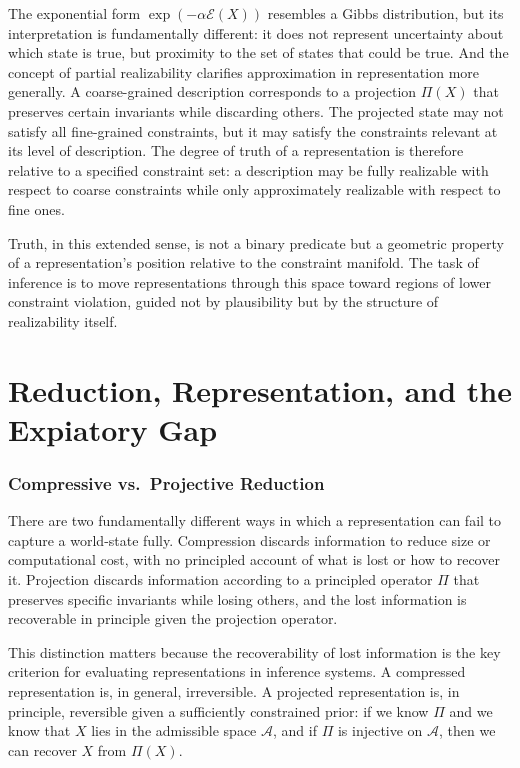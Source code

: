 \documentclass[11pt, oneside]{article}
\begin{document}
The exponential form $\exp(-\alpha \mathcal{E}(X))$ resembles a Gibbs distribution, but its interpretation is fundamentally different: it does not represent uncertainty about which state is true, but proximity to the set of states that could be true. And the concept of partial realizability clarifies approximation in representation more generally. A coarse-grained description corresponds to a projection $\Pi(X)$ that preserves certain invariants while discarding others. The projected state may not satisfy all fine-grained constraints, but it may satisfy the constraints relevant at its level of description. The degree of truth of a representation is therefore relative to a specified constraint set: a description may be fully realizable with respect to coarse constraints while only approximately realizable with respect to fine ones.

Truth, in this extended sense, is not a binary predicate but a geometric property of a representation's position relative to the constraint manifold. The task of inference is to move representations through this space toward regions of lower constraint violation, guided not by plausibility but by the structure of realizability itself.

\part{Reduction, Representation, and the Expiatory Gap}

\section{Compressive vs.\ Projective Reduction}

There are two fundamentally different ways in which a representation can fail to capture a world-state fully. Compression discards information to reduce size or computational cost, with no principled account of what is lost or how to recover it. Projection discards information according to a principled operator $\Pi$ that preserves specific invariants while losing others, and the lost information is recoverable in principle given the projection operator.

This distinction matters because the recoverability of lost information is the key criterion for evaluating representations in inference systems. A compressed representation is, in general, irreversible. A projected representation is, in principle, reversible given a sufficiently constrained prior: if we know $\Pi$ and we know that $X$ lies in the admissible space $\mathcal{A}$, and if $\Pi$ is injective on $\mathcal{A}$, then we can recover $X$ from $\Pi(X)$.
\end{document}

